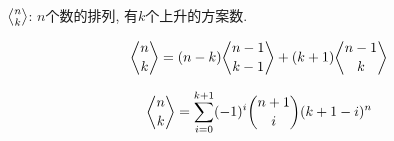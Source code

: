 \def \bangle{ \atopwithdelims \langle \rangle}

${n\bangle k}$: $n$个数的排列, 有$k$个上升的方案数.

$$ {n\bangle k} = (n - k){n - 1 \bangle k - 1} + (k + 1){n - 1 \bangle k} $$

$$ {n\bangle k} = \sum_{i = 0} ^ {k + 1} (-1)^i {n + 1\choose i} (k + 1 - i)^n $$